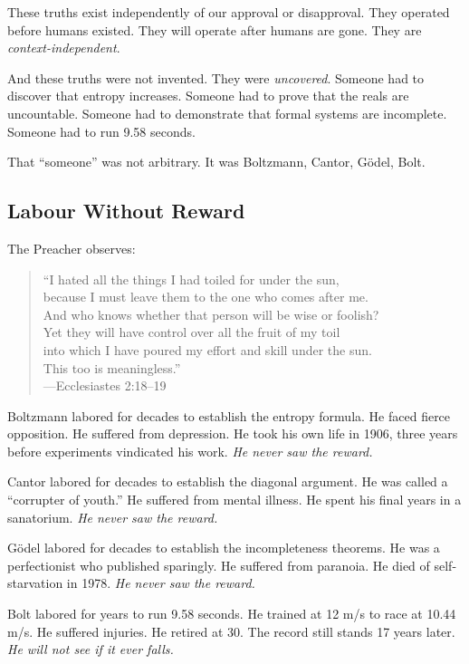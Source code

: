 \documentclass[11pt,a4paper]{article}
\begin{document}
These truths exist independently of our approval or disapproval. They operated 
before humans existed. They will operate after humans are gone. They are 
\emph{context-independent}.

And these truths were not invented. They were \emph{uncovered}. Someone had to 
discover that entropy increases. Someone had to prove that the reals are 
uncountable. Someone had to demonstrate that formal systems are incomplete. 
Someone had to run 9.58 seconds.

That ``someone'' was not arbitrary. It was Boltzmann, Cantor, Gödel, Bolt.

\subsection{Labour Without Reward}

The Preacher observes:

\begin{quote}
``I hated all the things I had toiled for under the sun,\\
because I must leave them to the one who comes after me.\\
And who knows whether that person will be wise or foolish?\\
Yet they will have control over all the fruit of my toil\\
into which I have poured my effort and skill under the sun.\\
This too is meaningless.''\\
\hfill---Ecclesiastes 2:18--19
\end{quote}

Boltzmann labored for decades to establish the entropy formula. He faced 
fierce opposition. He suffered from depression. He took his own life in 1906, 
three years before experiments vindicated his work. \emph{He never saw the 
reward.}

Cantor labored for decades to establish the diagonal argument. He was called a 
``corrupter of youth.'' He suffered from mental illness. He spent his final 
years in a sanatorium. \emph{He never saw the reward.}

Gödel labored for decades to establish the incompleteness theorems. He was a 
perfectionist who published sparingly. He suffered from paranoia. He died of 
self-starvation in 1978. \emph{He never saw the reward.}

Bolt labored for years to run 9.58 seconds. He trained at 12 m/s to race at 
10.44 m/s. He suffered injuries. He retired at 30. The record still stands 17 
years later. \emph{He will not see if it ever falls.}
\end{document}
